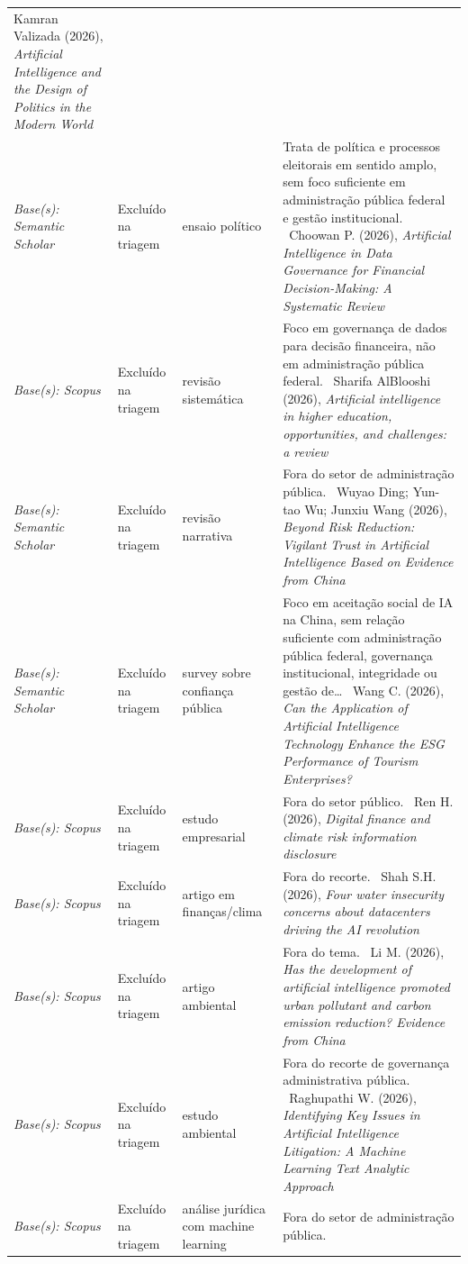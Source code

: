 \documentclass[12pt,a4paper]{article}
\begin{document}
\begin{longtable}{>{\raggedright\arraybackslash}p{} >{\raggedright\arraybackslash}p{} >{\raggedright\arraybackslash}p{} >{\raggedright\arraybackslash}p{}}
Kamran Valizada (2026), \textit{Artificial Intelligence and the Design of Politics in the Modern World}\\ \emph{Base(s): Semantic Scholar} & Excluído na triagem & ensaio político & Trata de política e processos eleitorais em sentido amplo, sem foco suficiente em administração pública federal e gestão institucional. \
Choowan P. (2026), \textit{Artificial Intelligence in Data Governance for Financial Decision-Making: A Systematic Review}\\ \emph{Base(s): Scopus} & Excluído na triagem & revisão sistemática & Foco em governança de dados para decisão financeira, não em administração pública federal. \
Sharifa AlBlooshi (2026), \textit{Artificial intelligence in higher education, opportunities, and challenges: a review}\\ \emph{Base(s): Semantic Scholar} & Excluído na triagem & revisão narrativa & Fora do setor de administração pública. \
Wuyao Ding; Yun-tao Wu; Junxiu Wang (2026), \textit{Beyond Risk Reduction: Vigilant Trust in Artificial Intelligence Based on Evidence from China}\\ \emph{Base(s): Semantic Scholar} & Excluído na triagem & survey sobre confiança pública & Foco em aceitação social de IA na China, sem relação suficiente com administração pública federal, governança institucional, integridade ou gestão de… \
Wang C. (2026), \textit{Can the Application of Artificial Intelligence Technology Enhance the ESG Performance of Tourism Enterprises?}\\ \emph{Base(s): Scopus} & Excluído na triagem & estudo empresarial & Fora do setor público. \
Ren H. (2026), \textit{Digital finance and climate risk information disclosure}\\ \emph{Base(s): Scopus} & Excluído na triagem & artigo em finanças/clima & Fora do recorte. \
Shah S.H. (2026), \textit{Four water insecurity concerns about datacenters driving the AI revolution}\\ \emph{Base(s): Scopus} & Excluído na triagem & artigo ambiental & Fora do tema. \
Li M. (2026), \textit{Has the development of artificial intelligence promoted urban pollutant and carbon emission reduction? Evidence from China}\\ \emph{Base(s): Scopus} & Excluído na triagem & estudo ambiental & Fora do recorte de governança administrativa pública. \
Raghupathi W. (2026), \textit{Identifying Key Issues in Artificial Intelligence Litigation: A Machine Learning Text Analytic Approach}\\ \emph{Base(s): Scopus} & Excluído na triagem & análise jurídica com machine learning & Fora do setor de administração pública. \

\end{longtable}
\end{document}
